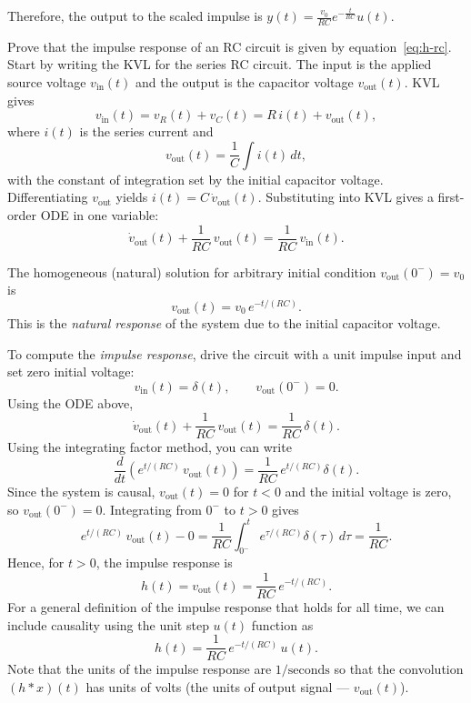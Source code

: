 \documentclass{ee102_notes}
\begin{document}
Therefore, the output to the scaled impulse is $y(t) = \frac{v_0}{RC} e^{-\frac{t}{RC}}u(t)$.

\begin{popquiz}
Prove that the impulse response of an RC circuit is given by equation~\eqref{eq:h-rc}.
\popqsplit
Start by writing the KVL for the series RC circuit. The input is the applied source voltage $v_{\text{in}}(t)$ and the output is the capacitor voltage $v_{\text{out}}(t)$. KVL gives
\[
v_{\text{in}}(t)=v_R(t)+v_C(t)=R\,i(t)+v_{\text{out}}(t),
\]
where $i(t)$ is the series current and
\[
v_{\text{out}}(t)=\frac{1}{C}\int i(t)\,dt,
\]
with the constant of integration set by the initial capacitor voltage. Differentiating $v_{\text{out}}$ yields $i(t)=C\,\dot v_{\text{out}}(t)$. Substituting into KVL gives a first-order ODE in one variable:
\[
\dot v_{\text{out}}(t)+\frac{1}{RC}\,v_{\text{out}}(t)=\frac{1}{RC}\,v_{\text{in}}(t).
\]

The homogeneous (natural) solution for arbitrary initial condition $v_{\text{out}}(0^-)=v_0$ is
\[
v_{\text{out}}(t)=v_0\,e^{-t/(RC)}.
\]
This is the \emph{natural response} of the system due to the initial capacitor voltage.

To compute the \emph{impulse response}, drive the circuit with a unit impulse input and set zero initial voltage:
\[
v_{\text{in}}(t)=\delta(t),\qquad v_{\text{out}}(0^-)=0.
\]
Using the ODE above,
\[
\dot v_{\text{out}}(t)+\frac{1}{RC}\,v_{\text{out}}(t)=\frac{1}{RC}\,\delta(t).
\]
Using the integrating factor method, you can write 
\[
\frac{d}{dt}\!\left(e^{t/(RC)}\,v_{\text{out}}(t)\right)=\frac{1}{RC}\,e^{t/(RC)}\delta(t).
\]
Since the system is causal, $v_{\text{out}}(t)=0$ for $t<0$ and the initial voltage is zero, so $v_{\text{out}}(0^-)=0$. Integrating from $0^-$ to $t>0$ gives
\[
e^{t/(RC)}\,v_{\text{out}}(t)-0=\frac{1}{RC}\!\int_{0^-}^{t}\!e^{\tau/(RC)}\delta(\tau)\,d\tau
=\frac{1}{RC}.
\]
Hence, for $t > 0$, the impulse response is 
\[
h(t) = v_{\text{out}}(t)=\frac{1}{RC}\,e^{-t/(RC)}.
\]
For a general definition of the impulse response that holds for all time, we can include causality using the unit step $u(t)$ function as
\[
h(t)=\frac{1}{RC}\,e^{-t/(RC)}\,u(t).
\]
Note that the units of the impulse response are $1/\text{seconds}$ so that the convolution $(h*x)(t)$ has units of volts (the units of output signal --- $v_{\text{out}}(t)$).

\end{popquiz}
\end{document}
